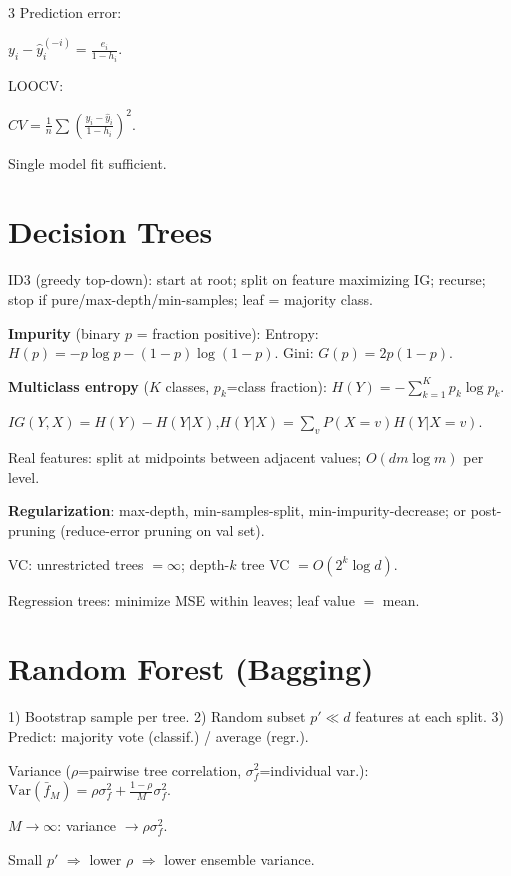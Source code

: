 \documentclass[8pt,fleqn]{extarticle}
\begin{document}
\begin{multicols}{3}
Prediction error:

$y_i-\hat y_i^{(-i)}
=
\frac{e_i}{1-h_i}$.

LOOCV:

$CV=\frac1n\sum
\left(\frac{y_i-\hat y_i}{1-h_i}\right)^2$.

Single model fit sufficient.

\section*{Decision Trees}

ID3 (greedy top-down): start at root; split on feature maximizing IG; recurse; stop if pure/max-depth/min-samples; leaf = majority class.

\textbf{Impurity} (binary $p$ = fraction positive):
Entropy: $H(p)=-p\log p-(1-p)\log(1-p)$.
Gini: $G(p)=2p(1-p)$.

\textbf{Multiclass entropy} ($K$ classes, $p_k$=class fraction):
$H(Y)=-\sum_{k=1}^K p_k\log p_k$.

$IG(Y,X)=H(Y)-H(Y|X)$,\quad $H(Y|X)=\sum_v P(X{=}v)H(Y|X{=}v)$.

Real features: split at midpoints between adjacent values; $O(dm\log m)$ per level.

\textbf{Regularization}: max-depth, min-samples-split, min-impurity-decrease; or post-pruning (reduce-error pruning on val set).

VC: unrestricted trees $=\infty$; depth-$k$ tree VC $=O(2^k\log d)$.

Regression trees: minimize MSE within leaves; leaf value $=$ mean.


\section*{Random Forest (Bagging)}

1) Bootstrap sample per tree.
2) Random subset $p'\!\ll\!d$ features at each split.
3) Predict: majority vote (classif.) / average (regr.).

Variance ($\rho$=pairwise tree correlation, $\sigma_f^2$=individual var.):
$\text{Var}(\bar f_M)=\rho\sigma_f^2+\frac{1-\rho}{M}\sigma_f^2$.

$M\!\to\!\infty$: variance $\to\rho\sigma_f^2$.

Small $p'$ $\Rightarrow$ lower $\rho$ $\Rightarrow$ lower ensemble variance.


\end{multicols}
\end{document}

